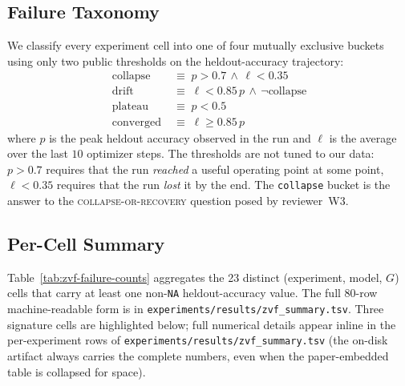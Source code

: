 \documentclass{article}
\begin{document}
\subsection{Failure Taxonomy}

We classify every experiment cell into one of four mutually exclusive
buckets using only two public thresholds on the heldout-accuracy
trajectory:
\begin{align}
\mathrm{collapse} &\;\equiv\; p > 0.7 \,\wedge\, \ell < 0.35 \label{eq:collapse}\\
\mathrm{drift} &\;\equiv\; \ell < 0.85\,p \,\wedge\, \neg\mathrm{collapse} \label{eq:drift}\\
\mathrm{plateau} &\;\equiv\; p < 0.5 \label{eq:plateau}\\
\mathrm{converged} &\;\equiv\; \ell \geq 0.85\,p \label{eq:converged}
\end{align}
where $p$ is the peak heldout accuracy observed in the run and
$\ell$ is the average over the last $10$ optimizer steps. The
thresholds are not tuned to our data: $p > 0.7$ requires that the run
\emph{reached} a useful operating point at some point, $\ell < 0.35$
requires that the run \emph{lost} it by the end. The
\texttt{collapse} bucket is the answer to the
\textsc{collapse-or-recovery} question posed by reviewer~W3.

\subsection{Per-Cell Summary}

Table~\ref{tab:zvf-failure-counts} aggregates the
23 distinct (experiment, model, $G$) cells that carry at least one
non-\texttt{NA} heldout-accuracy value. The full 80-row machine-readable
form is in \texttt{experiments/results/zvf\_summary.tsv}. Three
signature cells are highlighted below; full numerical details appear
inline in the per-experiment rows of
\texttt{experiments/results/zvf\_summary.tsv} (the on-disk
artifact always carries the complete numbers, even when the
paper-embedded table is collapsed for space).
\end{document}
